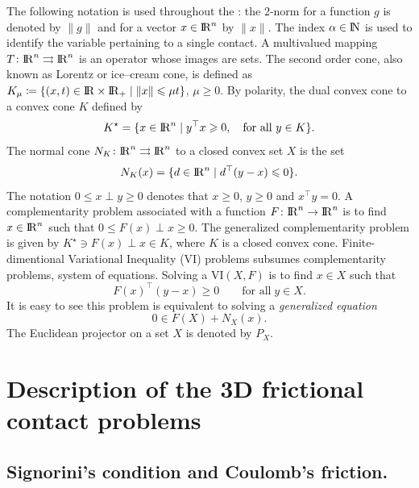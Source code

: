 {The following notation is used throughout the \chapterorreport{}: the 2-norm for a function $g$ is denoted  by $\|g\|$ and for a vector $x\in\mathrm{I\!R}^n$ by $\|x\|$. 
The index $\alpha\in\mathrm{I\!N}$ is used to identify the variable pertaining to a single contact.
A multivalued mapping $T\colon\mathrm{I\!R}^n\rightrightarrows\mathrm{I\!R}^n$ is an operator whose images are sets.
The second order cone, also known as Lorentz or ice--cream cone, is defined as $K_\mu \coloneqq\{(x, t)\in\mathrm{I\!R}\times\mathrm{I\!R}_+\mid \|x\|\leqslant \mu t\}$, $\mu\geq0$.
By polarity, the dual convex cone to a convex cone $K$ defined by
\begin{equation}
  \label{eq:dual-cone}
  K^\star = \{x \in \RR^n \mid  y^\top x \geq 0, \quad \text{for all } y \in K\}.
\end{equation}
The normal cone $N_K\colon\mathrm{I\!R}^n\rightrightarrows\mathrm{I\!R}^n$ to a closed convex set $X$ is the set
\begin{equation}
 N_K(x) = \{d\in\mathrm{I\!R}^n\mid d^\top(y - x) \leqslant 0\}.
\end{equation}
The notation $0\leq x\perp y\geq 0$ denotes that $x\geq0$, $y\geq0$ and $x^\top y = 0$.
A complementarity problem associated with a function $F\colon \mathrm{I\!R}^n\to\mathrm{I\!R}^n$ is to find $x\in\mathrm{I\!R}^n$ such that $0\leq F(x) \perp x \geq 0$.
The generalized complementarity problem is given by $K^\star\ni F(x) \perp x \in K$, where $K$ is a closed convex cone.
Finite-dimentional Variational Inequality (VI) problems subsumes complementarity problems, system of equations.
Solving a $\mathrm{VI}(X,F)$ is to find $x\in X$ such that
%
\begin{equation}
 F(x)^\top(y - x)\geq 0\qquad\text{for all}\; y\in X.
\end{equation}
%
It is easy to see this problem is equivalent to solving a \emph{generalized equation}
\begin{equation}
 0 \in F(X) + N_X(x).
\end{equation}
The Euclidean projector on a set $X$ is denoted by $P_X$.



\section{Description of the 3D frictional contact problems}
\label{sec:description}
\subsection{Signorini's condition and Coulomb's friction.}

}
